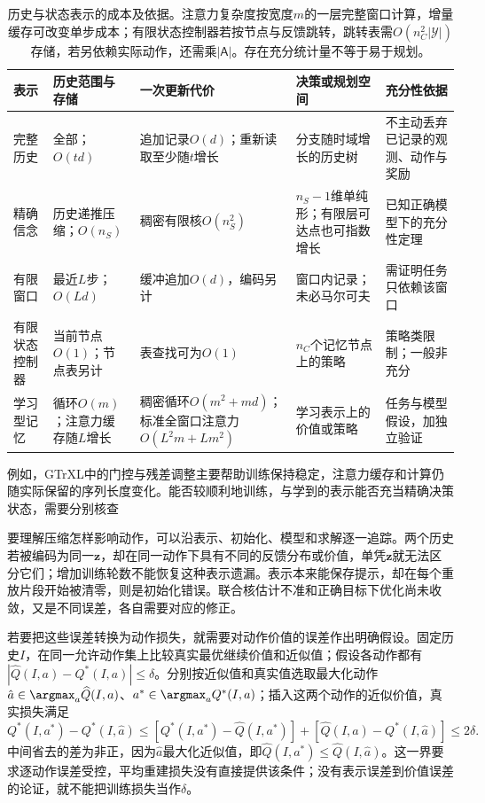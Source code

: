 \begin{table}[htbp]
  \centering
  \small
  \begin{tabularx}{\linewidth}{p{21mm}XXXX}
    \toprule
    表示 & 历史范围与存储 & 一次更新代价 & 决策或规划空间 & 充分性依据 \\
    \midrule
    完整历史 & 全部；$O(td)$ & 追加记录$O(d)$；重新读取至少随$t$增长 & 分支随时域增长的历史树 & 不主动丢弃已记录的观测、动作与奖励 \\
    精确信念 & 历史递推压缩；$O(n_S)$ & 稠密有限核$O(n_S^2)$ & $n_S-1$维单纯形；有限层可达点也可指数增长 & 已知正确模型下的充分性定理 \\
    有限窗口 & 最近$L$步；$O(Ld)$ & 缓冲追加$O(d)$，编码另计 & 窗口内记录；未必马尔可夫 & 需证明任务只依赖该窗口 \\
    有限状态控制器 & 当前节点$O(1)$；节点表另计 & 表查找可为$O(1)$ & $n_C$个记忆节点上的策略 & 策略类限制；一般非充分 \\
    学习型记忆 & 循环$O(m)$；注意力缓存随$L$增长 & 稠密循环$O(m^2+md)$；标准全窗口注意力$O(L^2m+Lm^2)$ & 学习表示上的价值或策略 & 任务与模型假设，加独立验证 \\
    \bottomrule
  \end{tabularx}
  \caption{历史与状态表示的成本及依据。注意力复杂度按宽度$m$的一层完整窗口计算，增量缓存可改变单步成本；有限状态控制器若按节点与反馈跳转，跳转表需$O(n_C^2|\mathcal Y|)$存储，若另依赖实际动作，还需乘$|\mathsf A|$。存在充分统计量不等于易于规划。}
  \label{tab:rl-information-memory-cost}
\end{table}

例如，GTrXL中的门控与残差调整主要帮助训练保持稳定，注意力缓存和计算仍随实际保留的序列长度变化。能否较顺利地训练，与学到的表示能否充当精确决策状态，需要分别核查

要理解压缩怎样影响动作，可以沿表示、初始化、模型和求解逐一追踪。两个历史若被编码为同一$\bm z$，却在同一动作下具有不同的反馈分布或价值，单凭$\bm z$就无法区分它们；增加训练轮数不能恢复这种表示遗漏。表示本来能保存提示，却在每个重放片段开始被清零，则是初始化错误。联合核估计不准和正确目标下优化尚未收敛，又是不同误差，各自需要对应的修正。

若要把这些误差转换为动作损失，就需要对动作价值的误差作出明确假设。固定历史$I$，在同一允许动作集上比较真实最优继续价值和近似值；假设各动作都有
$|\widehat Q(I,a)-Q^*(I,a)|\leq\delta$。分别按近似值和真实值选取最大化动作
$\hat a\in\argmax_a\widehat Q(I,a)$、$a^*\in\argmax_aQ^*(I,a)$；插入这两个动作的近似价值，真实损失满足
\[
  Q^*(I,a^*)-Q^*(I,\hat a)
  \leq
  [Q^*(I,a^*)-\widehat Q(I,a^*)]
  +[\widehat Q(I,\hat a)-Q^*(I,\hat a)]
  \leq2\delta.
\]
中间省去的差为非正，因为$\hat a$最大化近似值，即$\widehat Q(I,a^*)\leq\widehat Q(I,\hat a)$。这一界要求逐动作误差受控，平均重建损失没有直接提供该条件；没有表示误差到价值误差的论证，就不能把训练损失当作$\delta$。

